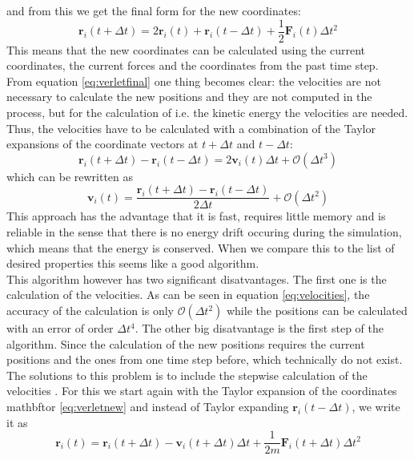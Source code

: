\documentclass[12pt]{article}
\begin{document}
and from this we get the final form for the new coordinates:
\begin{equation}
    \label{eq:verletfinal}
    \mathbf{r}_i(t+\Delta t) = 2\mathbf{r}_i(t)+ \mathbf{r}_i(t-\Delta t)+ \frac1{2} {\mathbf{F}}_i(t) \Delta t^2
\end{equation}
This means that the new coordinates can be calculated using the current coordinates, the current forces and the coordinates from the past time step.\\
From equation \eqref{eq:verletfinal} one thing becomes clear: the velocities are not necessary to calculate the new positions and they are not
computed in the process, but for the calculation of i.e. the kinetic energy the velocities are needed. Thus, the velocities have to be calculated with
a combination of the Taylor expansions of the coordinate vectors at $t+\Delta t$ and $t-\Delta t$:
\begin{equation}
    \mathbf{r}_i(t+\Delta t) - \mathbf{r}_i(t-\Delta t) = 2\mathbf{v}_i(t)\Delta t + \mathcal{O}(\Delta t^3)
\end{equation}
which can be rewritten as
\begin{equation}
    \label{eq:velocities}
    \mathbf{v}_i(t) = \frac{\mathbf{r}_i(t+\Delta t) - \mathbf{r}_i(t-\Delta t)}{2\Delta t} + \mathcal{O}(\Delta t^2)
\end{equation}
This approach has the advantage that it is fast, requires little memory and is reliable in the sense that there is no energy drift occuring during the
simulation, which means that the energy is conserved. When we compare this to the list of desired properties this seems like a good algorithm.\\
This algorithm however has two significant disatvantages. The first one is the calculation of the velocities. As can be seen in equation
\eqref{eq:velocities}, the accuracy of the calculation is only $\mathcal{O}(\Delta t^2)$ while the positions can be calculated with an error of order
$\Delta t^4$. The other big disatvantage is the first step of the algorithm. Since the calculation of the new positions requires the current positions
and the ones from one time step before, which technically do not exist.\\
The solutions to this problem is to include the stepwise calculation of the velocities \cite{swope1982}. For this we start again with the Taylor
expansion of the coordinates mathbftor \eqref{eq:verletnew} and instead of Taylor expanding $\mathbf{r}_i(t-\Delta t)$, we write it as 
\begin{equation}
    \mathbf{r}_i(t) = \mathbf{r}_i(t+\Delta t) - \mathbf{v}_i(t+\Delta t) \Delta t + \frac1{2m} \mathbf{F}_i(t+\Delta t) \Delta t^2
\end{equation}
\end{document}

